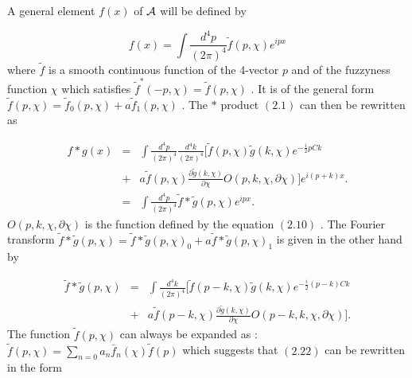 \documentclass[a4paper,12pt]{article}
\begin{document}

\vskip 5mm
\vskip 5mm
\noindent

A general element $f(x)$ of ${\cal A}$ will be
defined by

\begin{equation}
f(x)=\int \frac{d^4p}{(2{\pi})^4}\tilde{f}(p,\chi) e^{ipx}
\end{equation}
where $\tilde{f}$ is a smooth continuous function of the 4-vector
$p$ and of the fuzzyness function $\chi$ which satisfies
$\tilde{f}^{*}(-p,\chi)=\tilde{f}(p,\chi)$ . It is of the general
form $\tilde{f}(p,\chi)={\tilde{f}}_0(p,{\chi}) + a
{\tilde{f}}_1(p,{\chi}) $ . The $*$ product $(2.1)$ can then be
rewritten as

\begin{eqnarray}
f*g(x)&=&\int\frac{d^4p}{(2{\pi})^4}\frac{d^4k}{(2{\pi})^4}\bigg[\tilde{f}(p,\chi)\tilde{g}(k,\chi)e^{-\frac{i}{2}pCk}\nonumber\\
&+&a{\tilde{f}}(p,\chi){\frac{{\partial}{\tilde{g}(k,\chi)}}{{\partial}{\chi}}}O(p,k,\chi,{\partial}{\chi})\bigg]e^{i(p+k)x} .\nonumber\\
&=&\int\frac{d^4p}{(2{\pi})^4}\tilde{f}*\tilde{g}(p,\chi)e^{ipx}.
\end{eqnarray}
$O(p,k,\chi,{\partial}{\chi})$ is the function defined by the
equation $(2.10)$ . The Fourier transform
$\tilde{f}*\tilde{g}(p,\chi)={\tilde{f}*\tilde{g}}(p,\chi)_0+a{\tilde{f}*\tilde{g}}(p,\chi)_1$
is given in the other hand by

\begin{eqnarray}
{\tilde{f}*\tilde{g}}(p,\chi)&=&\int
\frac{d^4k}{(2{\pi})^4}\bigg[{\tilde{f}}(p-k,\chi){\tilde{g}}(k,\chi)e^{-\frac{i}{2}(p-k)Ck}\nonumber\\
&+&a{\tilde{f}}(p-k,\chi){\frac{{\partial}{{\tilde{g}}(k,\chi)}}{{\partial}{\chi}}}O(p-k,k,\chi,{\partial}{\chi})\bigg].
\end{eqnarray}
The function $\tilde{f}(p,\chi)$ can always be expanded as :
$\tilde{f}(p,\chi)=\sum_{n=0} a_n \bar{f}_{n}(\chi)\tilde{f}(p)$
which suggests that $(2.22)$ can be rewritten in the form
\cite{dop}
\end{document}
